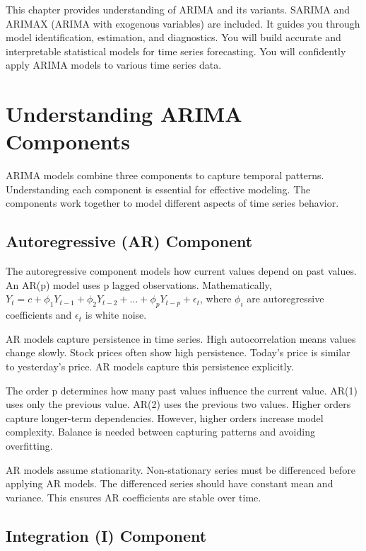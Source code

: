 This chapter provides understanding of ARIMA and its variants. SARIMA and ARIMAX (ARIMA with exogenous variables) are included. It guides you through model identification, estimation, and diagnostics. You will build accurate and interpretable statistical models for time series forecasting. You will confidently apply ARIMA models to various time series data.



\section{Understanding ARIMA Components}

ARIMA models combine three components to capture temporal patterns. Understanding each component is essential for effective modeling. The components work together to model different aspects of time series behavior.

\subsection{Autoregressive (AR) Component}

The autoregressive component models how current values depend on past values. An AR(p) model uses p lagged observations. Mathematically, \(Y_t = c + \phi_1 Y_{t-1} + \phi_2 Y_{t-2} + \ldots + \phi_p Y_{t-p} + \epsilon_t\), where \(\phi_i\) are autoregressive coefficients and \(\epsilon_t\) is white noise.

AR models capture persistence in time series. High autocorrelation means values change slowly. Stock prices often show high persistence. Today's price is similar to yesterday's price. AR models capture this persistence explicitly.

The order p determines how many past values influence the current value. AR(1) uses only the previous value. AR(2) uses the previous two values. Higher orders capture longer-term dependencies. However, higher orders increase model complexity. Balance is needed between capturing patterns and avoiding overfitting.

AR models assume stationarity. Non-stationary series must be differenced before applying AR models. The differenced series should have constant mean and variance. This ensures AR coefficients are stable over time.

\subsection{Integration (I) Component}

